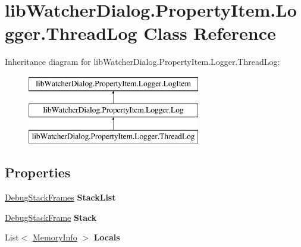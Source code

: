 \hypertarget{classlib_watcher_dialog_1_1_property_item_1_1_logger_1_1_thread_log}{\section{lib\+Watcher\+Dialog.\+Property\+Item.\+Logger.\+Thread\+Log Class Reference}
\label{classlib_watcher_dialog_1_1_property_item_1_1_logger_1_1_thread_log}
}
Inheritance diagram for lib\+Watcher\+Dialog.\+Property\+Item.\+Logger.\+Thread\+Log\+:\begin{figure}[H]
\begin{center}
\leavevmode
\includegraphics[height=3.000000cm]{classlib_watcher_dialog_1_1_property_item_1_1_logger_1_1_thread_log}
\end{center}
\end{figure}
\subsection*{Properties}
\begin{DoxyCompactItemize}
\item 
\hypertarget{classlib_watcher_dialog_1_1_property_item_1_1_logger_1_1_thread_log_a7a9f8cdcf94c845c68b7cb261e00824f}{\hyperlink{classlib_wather_debugger_1_1_stack_1_1_debug_stack_frames}{Debug\+Stack\+Frames} {\bfseries Stack\+List}}\label{classlib_watcher_dialog_1_1_property_item_1_1_logger_1_1_thread_log_a7a9f8cdcf94c845c68b7cb261e00824f}

\item 
\hypertarget{classlib_watcher_dialog_1_1_property_item_1_1_logger_1_1_thread_log_ad7f02a7203d0e2f498fe0f52c46b022f}{\hyperlink{classlib_wather_debugger_1_1_stack_1_1_debug_stack_frame}{Debug\+Stack\+Frame} {\bfseries Stack}}\label{classlib_watcher_dialog_1_1_property_item_1_1_logger_1_1_thread_log_ad7f02a7203d0e2f498fe0f52c46b022f}

\item 
\hypertarget{classlib_watcher_dialog_1_1_property_item_1_1_logger_1_1_thread_log_a1d1f4b87d016799aa0249a11a8e0f161}{List$<$ \hyperlink{classlib_wather_debugger_1_1_memory_1_1_memory_info}{Memory\+Info} $>$ {\bfseries Locals}}\label{classlib_watcher_dialog_1_1_property_item_1_1_logger_1_1_thread_log_a1d1f4b87d016799aa0249a11a8e0f161}

\end{DoxyCompactItemize}

